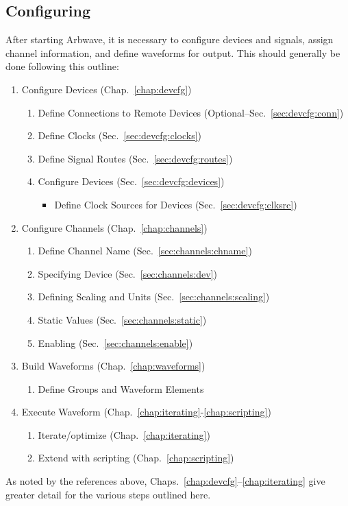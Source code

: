 \subsection{Configuring}
After starting Arbwave, it is necessary to configure devices and signals,
assign channel information, and define waveforms for output.  This should
generally be done following this outline:
%
\begin{enumerate}
  \item Configure Devices (Chap.~\ref{chap:devcfg})

    \begin{enumerate}
      \item Define Connections to Remote Devices
           (Optional--Sec.~\ref{sec:devcfg:conn})

      \item Define Clocks (Sec.~\ref{sec:devcfg:clocks})

      \item Define Signal Routes (Sec.~\ref{sec:devcfg:routes})

      \item Configure Devices (Sec.~\ref{sec:devcfg:devices})
        \begin{itemize}
          \item Define Clock Sources for Devices (Sec.~\ref{sec:devcfg:clksrc})
        \end{itemize}

    \end{enumerate}
  \item Configure Channels (Chap.~\ref{chap:channels})
    \begin{enumerate}
      \item Define Channel Name (Sec.~\ref{sec:channels:chname})
      \item Specifying Device (Sec.~\ref{sec:channels:dev})
      \item Defining Scaling and Units (Sec.~\ref{sec:channels:scaling})
      \item Static Values (Sec.~\ref{sec:channels:static})
      \item Enabling (Sec.~\ref{sec:channels:enable})
    \end{enumerate}

  \item Build Waveforms (Chap.~\ref{chap:waveforms})
    \begin{enumerate}
      \item Define Groups and Waveform Elements
    \end{enumerate}
  \item Execute Waveform (Chap.~\ref{chap:iterating}-\ref{chap:scripting})
    \begin{enumerate}
      \item Iterate/optimize (Chap.~\ref{chap:iterating})
      \item Extend with scripting (Chap.~\ref{chap:scripting})
    \end{enumerate}
\end{enumerate}
%
As noted by the references above, Chaps.~\ref{chap:devcfg}--\ref{chap:iterating} give greater detail for the
various steps outlined here.


